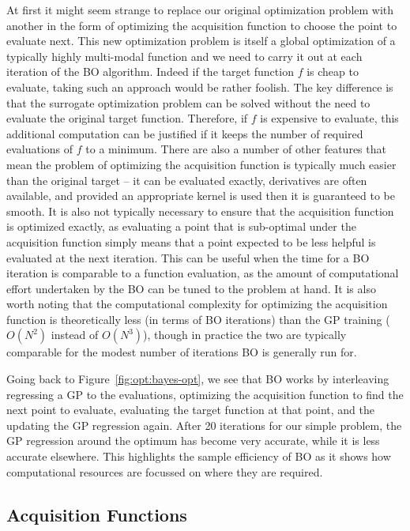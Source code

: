 At first it might seem strange to replace our original optimization problem with
another in the form of optimizing the acquisition function to choose the point
to evaluate next.  This new optimization problem is itself a global
optimization of a typically highly multi-modal function and we need to carry it out
at each iteration of the BO algorithm.  Indeed if the target function $f$ is cheap to
evaluate, taking such an approach would be rather foolish.
The key difference
is that the surrogate optimization problem can be solved without the need to evaluate
the original target function.  Therefore, if $f$ is expensive to evaluate, this additional
computation can be justified if it keeps the number of required evaluations of $f$ to
a minimum.  There are also a number of other features that mean the problem of
optimizing the acquisition function is typically much easier than the original target --
it can be evaluated exactly, derivatives are often available, and provided an appropriate kernel
is used then it is guaranteed to be smooth.  It is also not typically necessary to ensure
that the acquisition function is optimized exactly, as evaluating a point that is
sub-optimal under the acquisition function simply means that a point expected to be less
helpful is evaluated at the next iteration.  This can be useful when the time for a BO
iteration is comparable to a function evaluation, as the amount of computational effort
undertaken by the BO can be tuned to the problem at hand.  It is also worth noting that
the computational complexity for optimizing the acquisition function is theoretically less
(in terms of BO iterations) than the GP training ($O(N^2)$ instead of $O(N^3)$), though in
practice the two are typically comparable for the modest number of iterations BO is
generally run for.

Going back to Figure~\ref{fig:opt:bayes-opt}, we see that BO works by interleaving
regressing a GP to the evaluations, optimizing the acquisition function to find the next
point to evaluate, evaluating the target function at that point, and the updating the GP
regression again.  After 20 iterations for our simple problem, the GP regression around
the optimum has become very accurate, while it is less accurate elsewhere.  This
highlights the sample efficiency of BO as it shows how computational resources are
focussed on where they are required.

\subsection{Acquisition Functions}
\label{sec:opt:BO:acq}

